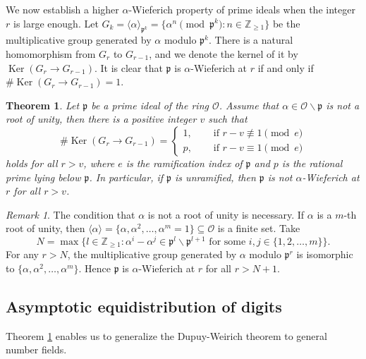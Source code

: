 \documentclass[12pt]{amsart}
\theoremstyle{plain}
\newtheorem{thm}{Theorem}[section]
\theoremstyle{definition}
\theoremstyle{remark}
\newtheorem{rem}{Remark}[section]
\numberwithin{equation}{section}
\DeclareMathOperator{\ke}{Ker}
\newcommand{\Z}{\mathbb Z}
\begin{document}
	We now establish a higher $\alpha$-Wieferich property of prime ideals when the integer $r$ is large enough. Let  $G_k=\langle\alpha\rangle_{\mathfrak{p}^k}=\{\alpha^n\!\!\pmod{\mathfrak{p}^k}\colon n\in\Z_{\ge1}\}$ be the multiplicative group generated by $\alpha$ modulo $\mathfrak{p}^k$. There is a natural homomorphism from $G_r$ to $G_{r-1}$, and we denote the kernel of it by $\ke(G_r\to G_{r-1})$. It is clear that $\mathfrak{p}$ is $\alpha$-Wieferich at $r$ if and only if $\#\ke(G_r\to G_{r-1})=1$.
	\begin{thm}\label{2505091458}
		Let $\mathfrak{p}$ be a prime ideal of the ring $\mathcal{O}$. Assume that $\alpha\in\mathcal{O}\backslash\mathfrak{p}$ is not a root of unity, then there is a positive integer $v$ such that
		\[\#\ke(G_r\to G_{r-1})=\begin{cases}
			1,&\quad \text{ if } r-v\not\equiv1\pmod{e}\\
			p,&\quad \text{ if } r-v\equiv1\pmod{e}
		\end{cases}\]
		holds for all $r> v$, where $e$ is the ramification index of $\mathfrak{p}$ and $p$ is the rational prime lying below $\mathfrak{p}$. In particular, if $\mathfrak{p}$ is unramified, then $\mathfrak{p}$ is not $\alpha$-Wieferich at $r$ for all $r>v$. 
	\end{thm}
	
	\begin{rem}
		The condition that $\alpha$ is not a root of unity is necessary. If $\alpha$ is a $m$-th root of unity, then $\langle \alpha\rangle=\{\alpha,\alpha^2,\dots,\alpha^m=1\}\subseteq\mathcal{O}$ is a finite set. Take 
		$$N=\max\Big\{l\in\Z_{\ge1}\colon  \alpha^i-\alpha^j\in\mathfrak{p}^{l}\backslash\mathfrak{p}^{l+1}\text{ for some }i,j\in\{1,2,\dots,m\}\Big\}.$$
		For any $r>N$, the multiplicative group generated by $\alpha$ modulo $\mathfrak{p}^{r}$ is isomorphic to $\{\alpha,\alpha^2,\dots,\alpha^m\}$. Hence $\mathfrak{p}$ is $\alpha$-Wieferich at $r$ for all $r>N+1$. 
	\end{rem}
	
	
	\subsection{Asymptotic equidistribution of digits}
	Theorem \ref{2505091458} enables us to generalize the Dupuy-Weirich \cite{Dupuy2016a} theorem to general number fields. 
	
\end{document}
